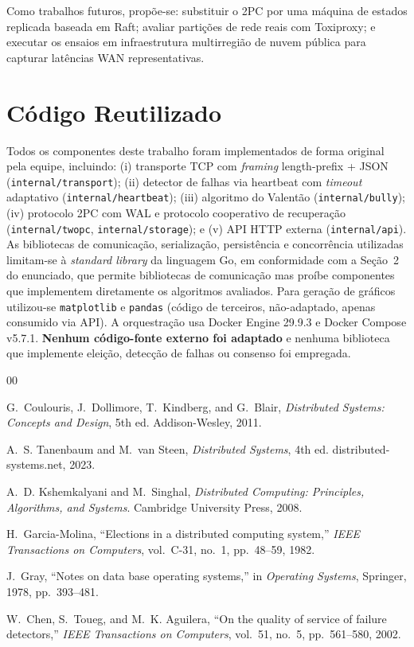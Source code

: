 \documentclass[conference]{IEEEtran}
\begin{document}
Como trabalhos futuros, propõe-se: substituir o 2PC por uma máquina de estados replicada baseada em Raft; avaliar partições de rede reais com Toxiproxy; e executar os ensaios em infraestrutura multirregião de nuvem pública para capturar latências WAN representativas.

\section*{Código Reutilizado}

Todos os componentes deste trabalho foram implementados de forma original pela equipe, incluindo: (i) transporte TCP com \emph{framing} length-prefix + JSON (\texttt{internal/transport}); (ii) detector de falhas via heartbeat com \emph{timeout} adaptativo (\texttt{internal/heartbeat}); (iii) algoritmo do Valentão (\texttt{internal/bully}); (iv) protocolo 2PC com WAL e protocolo cooperativo de recuperação (\texttt{internal/twopc}, \texttt{internal/storage}); e (v) API HTTP externa (\texttt{internal/api}). As bibliotecas de comunicação, serialização, persistência e concorrência utilizadas limitam-se à \emph{standard library} da linguagem Go, em conformidade com a Seção~2 do enunciado, que permite bibliotecas de comunicação mas proíbe componentes que implementem diretamente os algoritmos avaliados. Para geração de gráficos utilizou-se \texttt{matplotlib} e \texttt{pandas} (código de terceiros, não-adaptado, apenas consumido via API). A orquestração usa Docker Engine 29.9.3 e Docker Compose v5.7.1. \textbf{Nenhum código-fonte externo foi adaptado} e nenhuma biblioteca que implemente eleição, detecção de falhas ou consenso foi empregada.

\begin{thebibliography}{00}

G.~Coulouris, J.~Dollimore, T.~Kindberg, and G.~Blair,
\textit{Distributed Systems: Concepts and Design}, 5th ed.
Addison-Wesley, 2011.

A.~S. Tanenbaum and M.~van Steen,
\textit{Distributed Systems}, 4th ed.
distributed-systems.net, 2023.

A.~D. Kshemkalyani and M.~Singhal,
\textit{Distributed Computing: Principles, Algorithms, and Systems}.
Cambridge University Press, 2008.

H.~Garcia-Molina,
``Elections in a distributed computing system,''
\textit{IEEE Transactions on Computers}, vol.~C-31, no.~1, pp.~48--59, 1982.

J.~Gray,
``Notes on data base operating systems,''
in \textit{Operating Systems}, Springer, 1978, pp.~393--481.

W.~Chen, S.~Toueg, and M.~K. Aguilera,
``On the quality of service of failure detectors,''
\textit{IEEE Transactions on Computers}, vol.~51, no.~5, pp.~561--580, 2002.

\end{thebibliography}
\end{document}
